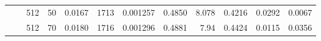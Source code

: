 \begin{table}[H]
{\begin{tabular}{llllrrrrrrrr}
 	& & 512 & 50 & {\cellcolor[HTML]{EBEBF3}} \color[HTML]{000000} 0.0167 & {\cellcolor[HTML]{0909FF}} \color[HTML]{F1F1F1} 1713 & {\cellcolor[HTML]{E9E9F3}} \color[HTML]{000000} 0.001257 & {\cellcolor[HTML]{1414FE}} \color[HTML]{F1F1F1} 0.4850 & {\cellcolor[HTML]{E6E6F3}} \color[HTML]{000000} 8.078 & {\cellcolor[HTML]{1818FE}} \color[HTML]{F1F1F1} 0.4216 & {\cellcolor[HTML]{EDEDF3}} \color[HTML]{000000} 0.0292 & {\cellcolor[HTML]{F0F0F3}} \color[HTML]{000000} 0.0067 \\
 	& & 512 & 70 & {\cellcolor[HTML]{E8E8F3}} \color[HTML]{000000} 0.0180 & {\cellcolor[HTML]{0808FF}} \color[HTML]{F1F1F1} 1716 & {\cellcolor[HTML]{E8E8F3}} \color[HTML]{000000} 0.001296 & {\cellcolor[HTML]{1111FE}} \color[HTML]{F1F1F1} 0.4881 & {\cellcolor[HTML]{E8E8F3}} \color[HTML]{000000} 7.94 & {\cellcolor[HTML]{0C0CFE}} \color[HTML]{F1F1F1} 0.4424 & {\cellcolor[HTML]{F0F0F3}} \color[HTML]{000000} 0.0115 & {\cellcolor[HTML]{EAEAF3}} \color[HTML]{000000} 0.0356 \\
 	\bottomrule[2.5pt]
  \end{tabular}
}
\end{table}
 
